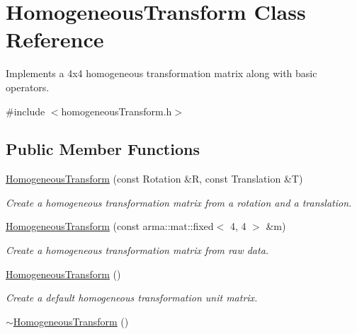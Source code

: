 \hypertarget{class_homogeneous_transform}{\section{Homogeneous\+Transform Class Reference}
\label{class_homogeneous_transform}
}


Implements a 4x4 homogeneous transformation matrix along with basic operators.  




{\ttfamily \#include $<$homogeneous\+Transform.\+h$>$}

\subsection*{Public Member Functions}
\begin{DoxyCompactItemize}
\item 
\hyperlink{class_homogeneous_transform_a03379cc60fdc2aefbf7b29fa7cfc8cd4}{Homogeneous\+Transform} (const Rotation \&R, const Translation \&T)
\begin{DoxyCompactList}\small\item\em Create a homogeneous transformation matrix from a rotation and a translation. \end{DoxyCompactList}\item 
\hyperlink{class_homogeneous_transform_a6c318ba44621401f9ae818ef45f6c4c1}{Homogeneous\+Transform} (const arma\+::mat\+::fixed$<$ 4, 4 $>$ \&m)
\begin{DoxyCompactList}\small\item\em Create a homogeneous transformation matrix from raw data. \end{DoxyCompactList}\item 
\hypertarget{class_homogeneous_transform_aecbf1f1e9d0e535878c5c940ee0d4d84}{\hyperlink{class_homogeneous_transform_aecbf1f1e9d0e535878c5c940ee0d4d84}{Homogeneous\+Transform} ()}\label{class_homogeneous_transform_aecbf1f1e9d0e535878c5c940ee0d4d84}

\begin{DoxyCompactList}\small\item\em Create a default homogeneous transformation unit matrix. \end{DoxyCompactList}\item 
\hypertarget{class_homogeneous_transform_a1db68084f85eb15b7c1fa6011c0636a4}{\hyperlink{class_homogeneous_transform_a1db68084f85eb15b7c1fa6011c0636a4}{$\sim$\+Homogeneous\+Transform} ()}\label{class_homogeneous_transform_a1db68084f85eb15b7c1fa6011c0636a4}


\end{DoxyCompactItemize}
